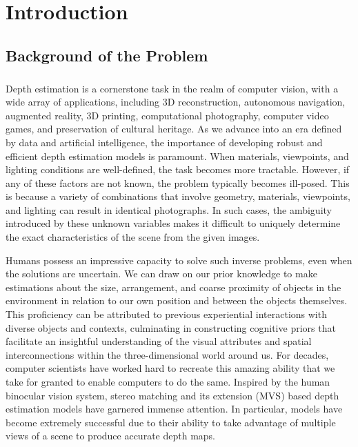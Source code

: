 \chapter{Introduction}\label{chap:introduction}

\section{Background of the Problem}\label{sec:Background motivation of the problem}
    \paragraph{}Depth estimation is a cornerstone task in the realm of computer vision, with a wide array of applications, including 3D reconstruction, autonomous navigation, augmented reality, 3D printing, computational photography, computer video games, and preservation of cultural heritage. As we advance into an era defined by data and artificial intelligence, the importance of developing robust and efficient depth estimation models is paramount. When materials, viewpoints, and lighting conditions are well-defined, the task becomes more tractable. However, if any of these factors are not known, the problem typically becomes ill-posed. This is because a variety of combinations that involve geometry, materials, viewpoints, and lighting can result in identical photographs. In such cases, the ambiguity introduced by these unknown variables makes it difficult to uniquely determine the exact characteristics of the scene from the given images.\par 
    Humans possess an impressive capacity to solve such inverse problems, even when the solutions are uncertain. We can draw on our prior knowledge to make estimations about the size, arrangement, and coarse proximity of objects in the environment in relation to our own position and between the objects themselves. This proficiency can be attributed to previous experiential interactions with diverse objects and contexts, culminating in constructing cognitive priors that facilitate an insightful understanding of the visual attributes and spatial interconnections within the three-dimensional world around us. For decades, computer scientists have worked hard to recreate this amazing ability that we take for granted to enable computers to do the same. Inspired by the human binocular vision system, stereo matching and its extension {\mvs} (MVS)\cite{Seitz2006} based depth estimation models have garnered immense attention. In particular, {\mvs} models have become extremely successful due to their ability to take advantage of multiple views of a scene to produce accurate depth maps. \par

